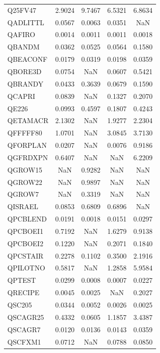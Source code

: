 \begin{longtable}{lcccc}
Q25FV47  &   2.9024 &   9.7467 &   6.5321 &   6.8634 \\
QADLITTL &   0.0567 &   0.0063 &   0.0351 &      NaN \\
QAFIRO   &   0.0014 &   0.0011 &   0.0011 &   0.0018 \\
QBANDM   &   0.0362 &   0.0525 &   0.0564 &   0.1580 \\
QBEACONF &   0.0179 &   0.0319 &   0.0198 &   0.0359 \\
QBORE3D  &   0.0754 &      NaN &   0.0607 &   0.5421 \\
QBRANDY  &   0.0433 &   0.3639 &   0.0679 &   0.1590 \\
QCAPRI   &   0.0839 &      NaN &   0.1327 &   0.2070 \\
QE226    &   0.0993 &   0.4597 &   0.1807 &   0.4243 \\
QETAMACR &   2.1302 &      NaN &   1.9277 &   2.2304 \\
QFFFFF80 &   1.0701 &      NaN &   3.0845 &   3.7130 \\
QFORPLAN &   0.0207 &      NaN &   0.0076 &   0.9186 \\
QGFRDXPN &   0.6407 &      NaN &      NaN &   6.2209 \\
QGROW15  &      NaN &   0.9282 &      NaN &      NaN \\
QGROW22  &      NaN &   0.9897 &      NaN &      NaN \\
QGROW7   &      NaN &   0.3319 &      NaN &      NaN \\
QISRAEL  &   0.0853 &   0.6809 &   0.6896 &      NaN \\
QPCBLEND &   0.0191 &   0.0018 &   0.0151 &   0.0297 \\
QPCBOEI1 &   0.7192 &      NaN &   1.6279 &   0.9138 \\
QPCBOEI2 &   0.1220 &      NaN &   0.2071 &   0.1840 \\
QPCSTAIR &   0.2278 &   0.1102 &   0.3500 &   2.1916 \\
QPILOTNO &   0.5817 &      NaN &   1.2858 &   5.9584 \\
QPTEST   &   0.0299 &   0.0008 &   0.0007 &   0.0227 \\
QRECIPE  &   0.0045 &   0.0025 &      NaN &   0.2027 \\
QSC205   &   0.0344 &   0.0052 &   0.0026 &   0.0025 \\
QSCAGR25 &   0.4332 &   0.0605 &   1.1857 &   3.4387 \\
QSCAGR7  &   0.0120 &   0.0136 &   0.0143 &   0.0359 \\
QSCFXM1  &   0.0712 &      NaN &   0.0788 &   0.0850 \\

\end{longtable}
